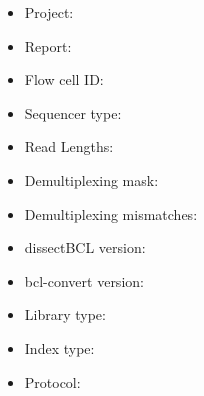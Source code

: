 \documentclass[8pt]{article}
\begin{document}
\begin{itemize}
  \setlength\itemsep{-0.5em}
  \item Project: %
  \item Report: %
  \item Flow cell ID: %
  \item Sequencer type: %
  \item Read Lengths: %
  \item Demultiplexing mask: %
  \item Demultiplexing mismatches: %
  \item dissectBCL version: %
  \item bcl-convert version: %
  \item Library type: %
  \item Index type: %
  \item Protocol: %
\end{itemize}
\end{document}

